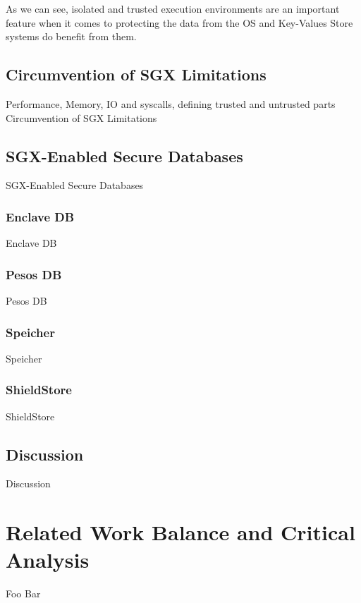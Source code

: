 As we can see, isolated and trusted execution environments are an important feature when it comes to protecting the data from the \gls{OS} and Key-Values Store systems do benefit from them.

\subsection{Circumvention of SGX Limitations}
\label{ssec:circumvention_of_sgx_limitations}

Performance, Memory, IO and syscalls, defining trusted and untrusted parts
Circumvention of SGX Limitations

\subsection{SGX-Enabled Secure Databases}
\label{ssec:sgx_enabled_secure_databases}

SGX-Enabled Secure Databases

\subsubsection{Enclave DB}
\label{sssec:enclave_db}

Enclave DB

\subsubsection{Pesos DB}
\label{sssec:pesos_db}

Pesos DB

\subsubsection{Speicher}
\label{sssec:speicher}

Speicher

\subsubsection{ShieldStore}
\label{sssec:shieldstore}

ShieldStore

\subsection{Discussion}
\label{ssec:s3_discussion}

Discussion




\section{Related Work Balance and Critical Analysis}
\label{sec:related_work_balance_and_critical_analysis}
%
%
Foo Bar
%
